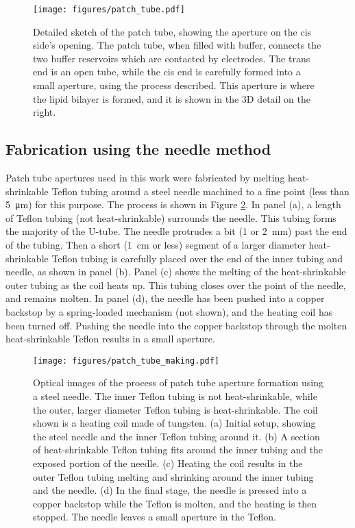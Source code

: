 \begin{figure}[h]
\begin{centering}
\texttt{[image: figures/patch\_tube.pdf]}
\caption[Schematic of patch tube]{Detailed sketch of the patch tube, showing the aperture on the cis side's opening.  The patch tube, when filled with buffer, connects the two buffer reservoirs which are contacted by electrodes.  The trans end is an open tube, while the cis end is carefully formed into a small aperture, using the process described.  This aperture is where the lipid bilayer is formed, and it is shown in the 3D detail on the right.}
\label{fig:patch_tube}
\end{centering}
\end{figure}

\subsection{Fabrication using the needle method}

Patch tube apertures used in this work were fabricated by melting heat-shrinkable Teflon tubing around a steel needle machined to a fine point (less than \SI{5}{\um}) for this purpose.  The process is shown in Figure \ref{fig:patch_tube_needle}.  In panel (a), a length of Teflon tubing (not heat-shrinkable) surrounds the needle.  This tubing forms the majority of the U-tube.  The needle protrudes a bit (\num{1} or \SI{2}{\mm}) past the end of the tubing.  Then a short (\SI{1}{\cm} or less) segment of a larger diameter heat-shrinkable Teflon tubing is carefully placed over the end of the inner tubing and needle, as shown in panel (b).  Panel (c) shows the melting of the heat-shrinkable outer tubing as the coil heats up.  This tubing closes over the point of the needle, and remains molten.  In panel (d), the needle has been pushed into a copper backstop by a spring-loaded mechanism (not shown), and the heating coil has been turned off.  Pushing the needle into the copper backstop through the molten heat-shrinkable Teflon results in a small aperture.

\begin{figure}[h]
\begin{centering}
\texttt{[image: figures/patch\_tube\_making.pdf]}
\caption[Patch tube aperture made using a steel needle]{Optical images of the process of patch tube aperture formation using a steel needle.  The inner Teflon tubing is not heat-shrinkable, while the outer, larger diameter Teflon tubing is heat-shrinkable.  The coil shown is a heating coil made of tungsten.  (a) Initial setup, showing the steel needle and the inner Teflon tubing around it.  (b) A section of heat-shrinkable Teflon tubing fits around the inner tubing and the exposed portion of the needle.  (c) Heating the coil results in the outer Teflon tubing melting and shrinking around the inner tubing and the needle.  (d) In the final stage, the needle is pressed into a copper backstop while the Teflon is molten, and the heating is then stopped.  The needle leaves a small aperture in the Teflon.}
\label{fig:patch_tube_needle}
\end{centering}
\end{figure}

